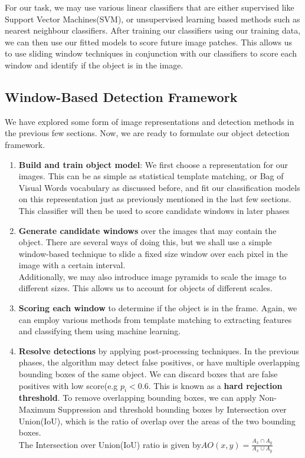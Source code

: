 \documentclass[12pt]{article}
\begin{document}
For our task, we may use various linear classifiers that are either supervised like Support Vector Machines(SVM), or unsupervised learning based methods such as nearest neighbour classifiers. After training our classifiers using our training data, we can then use our fitted models to score future image patches. This allows us to use sliding window techniques in conjunction with our classifiers to score each window and identify if the object is in the image.

\subsection{Window-Based Detection Framework}

We have explored some form of image representations and detection methods in the previous few sections. Now, we are ready to formulate our object detection framework.
\begin{enumerate}
\item \textbf{Build and train object model}: We first choose a representation for our images. This can be as simple as statistical template matching, or Bag of Visual Words vocabulary as discussed before, and fit our classification models on this representation just as previously mentioned in the last few sections. This classifier will then be used to score candidate windows in later phases
\item \textbf{Generate candidate windows} over the images that may contain the object. There are several ways of doing this, but we shall use a simple window-based technique to slide a fixed size window over each pixel in the image with a certain interval.\\

Additionally, we may also introduce image pyramids to scale the image to different sizes. This allows us to account for objects of different scales.
\item \textbf{Scoring each window} to determine if the object is in the frame. Again, we can employ various methods from template matching to extracting features and classifying them using machine learning.
\item \textbf{Resolve detections} by applying post-processing techniques. In the previous phases, the algorithm may detect false positives, or have multiple overlapping bounding boxes of the same object. We can discard boxes that are false positives with low score(e.g $p_i < 0.6$. This is known as a \textbf{hard rejection threshold}. To remove overlapping bounding boxes, we can apply Non-Maximum Suppression and threshold bounding boxes by Intersection over Union(IoU), which is the ratio of overlap over the areas of the two bounding boxes.\\

The Intersection over Union(IoU) ratio is given by$AO(x, y) = \frac{A_x \cap A_y}{A_x \cup A_y}$
\end{enumerate}
\end{document}
